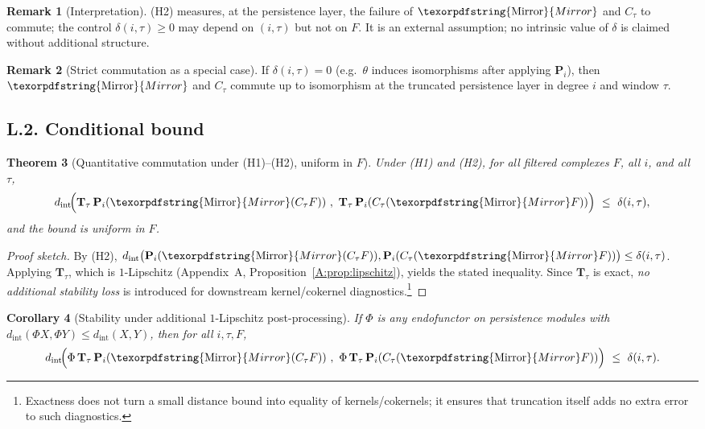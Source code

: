 \documentclass[11pt]{article}
\numberwithin{equation}{section}
\newtheorem{theorem}{Theorem}[section]
\newtheorem{corollary}[theorem]{Corollary}
\theoremstyle{definition}
\newtheorem{remark}[theorem]{Remark}
\DeclareRobustCommand{\Mirror}{\texorpdfstring{\ensuremath{\operatorname{Mirror}}}{Mirror}}
\providecommand{\n}{\unskip\space}
\begin{document}
\begin{remark}[Interpretation]
(H2) measures, at the persistence layer, the failure of \(\Mirror\) and \(C_\tau\) to commute; the control \(\delta(i,\tau)\ge 0\) may depend on \((i,\tau)\) but not on \(F\). It is an external assumption; no intrinsic value of \(\delta\) is claimed without additional structure.
\end{remark}

\begin{remark}[Strict commutation as a special case]
If \(\delta(i,\tau)=0\) (e.g.\ \(\theta\) induces isomorphisms after applying \(\mathbf{P}_i\)), then \(\Mirror\) and \(C_\tau\) commute up to isomorphism at the truncated persistence layer in degree \(i\) and window \(\tau\).
\end{remark}

\subsection*{L.2. Conditional bound}
\begin{theorem}[Quantitative commutation under (H1)–(H2), uniform in \(F\)]\label{L:thm:cond}
Under \emph{(H1)} and \emph{(H2)}, for all filtered complexes \(F\), all \(i\), and all \(\tau\),
\[
  d_{\mathrm{int}}\!\Big(
      \mathbf{T}_\tau\,\mathbf{P}_i(\Mirror(C_\tau F))\ ,\ 
      \mathbf{T}_\tau\,\mathbf{P}_i(C_\tau(\Mirror F))\n  \Big)\ \le\ \delta(i,\tau),
\]
and the bound is \emph{uniform in \(F\)}.
\end{theorem}

\begin{proof}[Proof sketch]
By (H2),
\(d_{\mathrm{int}}\big(\mathbf{P}_i(\Mirror(C_\tau F)),\mathbf{P}_i(C_\tau(\Mirror F))\big)\le\delta(i,\tau)\).
Applying \(\mathbf{T}_\tau\), which is \(1\)-Lipschitz (Appendix~A, Proposition~\ref{A:prop:lipschitz}), yields the stated inequality.
Since \(\mathbf{T}_\tau\) is exact, \emph{no additional stability loss} is introduced for downstream kernel/cokernel diagnostics.\footnote{Exactness does not turn a small distance bound into equality of kernels/cokernels; it ensures that truncation itself adds no extra error to such diagnostics.}
\end{proof}

\begin{corollary}[Stability under additional \(1\)-Lipschitz post-processing]
If \(\Phi\) is any endofunctor on persistence modules with \(d_{\mathrm{int}}(\Phi X,\Phi Y)\le d_{\mathrm{int}}(X,Y)\), then for all \(i,\tau,F\),
\[
  d_{\mathrm{int}}\!\Big(
      \Phi\,\mathbf{T}_\tau\,\mathbf{P}_i(\Mirror(C_\tau F))\ ,\ 
      \Phi\,\mathbf{T}_\tau\,\mathbf{P}_i(C_\tau(\Mirror F))\n  \Big)\ \le\ \delta(i,\tau).
\]
\end{corollary}
\end{document}
